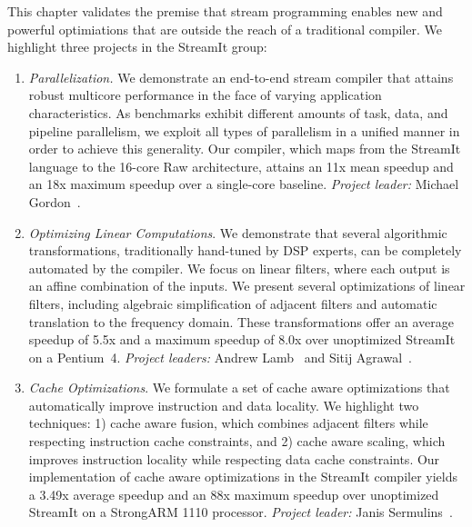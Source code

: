 \label{chap:optimizing}

This chapter validates the premise that stream programming enables new
and powerful optimiations that are outside the reach of a traditional
compiler.  We highlight three projects in the StreamIt group:

\begin{enumerate}

\item {\it Parallelization.}  We demonstrate an end-to-end stream 
compiler that attains robust multicore performance in the face of
varying application characteristics.  As benchmarks exhibit different
amounts of task, data, and pipeline parallelism, we exploit all types
of parallelism in a unified manner in order to achieve this
generality.  Our compiler, which maps from the StreamIt language to
the 16-core Raw architecture, attains an 11x mean speedup and an 18x
maximum speedup over a single-core baseline.  {\it Project leader:}
Michael Gordon~\cite{gordon06asplos}.

\item {\it Optimizing Linear Computations}.  We demonstrate that 
several algorithmic transformations, traditionally hand-tuned by DSP
experts, can be completely automated by the compiler.  We focus on
linear filters, where each output is an affine combination of the
inputs.  We present several optimizations of linear filters, including
algebraic simplification of adjacent filters and automatic translation
to the frequency domain.  These transformations offer an average
speedup of 5.5x and a maximum speedup of 8.0x over unoptimized
StreamIt on a Pentium~4.  {\it Project leaders:} Andrew
Lamb~\cite{lamb:pldi:2003,lamb-thesis} and Sitij
Agrawal~\cite{agrawal:cases:2005,agrawal-thesis}.

\item {\it Cache Optimizations}.   We formulate a set of cache aware 
optimizations that automatically improve instruction and data
locality.  We highlight two techniques: 1) cache aware fusion, which
combines adjacent filters while respecting instruction cache
constraints, and 2) cache aware scaling, which improves instruction
locality while respecting data cache constraints.  Our implementation
of cache aware optimizations in the StreamIt compiler yields a 3.49x
average speedup and an 88x maximum speedup over unoptimized StreamIt
on a StrongARM 1110 processor.  {\it Project leader:} Janis
Sermulins~\cite{sermulins:lctes:2005,sermulins-thesis}.

\end{enumerate}

